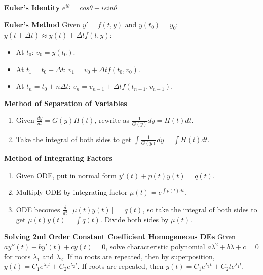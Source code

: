 \documentclass[8pt,letterpaper,boxed]{hmcpset}
\begin{document}
\textbf{Euler's Identity}
$e^{i\theta} = cos\theta + i sin\theta$

\textbf{Euler's Method}
Given $y' = f(t,y)$ and $y(t_0) = y_0$: $y(t+\Delta t) \approx y(t) + \Delta t f(t,y)$:
    \begin{itemize}
        \item At $t_0$: $v_0 = y(t_0)$.
        \item At $t_1 = t_0 + \Delta t$: $v_1 = v_0 + \Delta t f(t_0, v_0)$.
        \item At $t_n = t_0 + n\Delta t$: $v_n = v_{n-1} + \Delta t f(t_{n-1}, v_{n-1})$.
    \end{itemize}


\textbf{Method of Separation of Variables}
\begin{enumerate}
    \item Given $\frac{dy}{dt} = G(y)H(t)$, rewrite as $\frac{1}{G(y)}dy = H(t)dt$.
    \item Take the integral of both sides to get $\int \frac{1}{G(y)}dy = \int H(t)dt$.
\end{enumerate}


\textbf{Method of Integrating Factors}
\begin{enumerate}
    \item Given ODE, put in normal form $y'(t) + p(t)y(t) = q(t)$.
    \item Multiply ODE by integrating factor $\mu (t) = e^{\int p(t)dt}$.
    \item ODE becomes $\frac{d}{dt} [\mu (t) y(t)] = q(t)$, so take the integral of both sides to get $\mu (t) y(t) = \int q(t)$. Divide both sides by $\mu (t)$.
\end{enumerate}

\textbf{Solving 2nd Order Constant Coefficient Homogeneous DEs}
Given $a y''(t) + b y'(t) + c y(t) = 0$, solve characteristic polynomial $a\lambda ^2+b\lambda +c = 0$ for roots $\lambda _1$ and $\lambda _2$. If no roots are repeated, then by superposition, $y(t) = C_1e^{\lambda_1 t}+C_2e^{\lambda_2 t}$. If roots are repeated, then $y(t) = C_1e^{\lambda_1 t}+C_2te^{\lambda_1 t}$.
\end{document}
